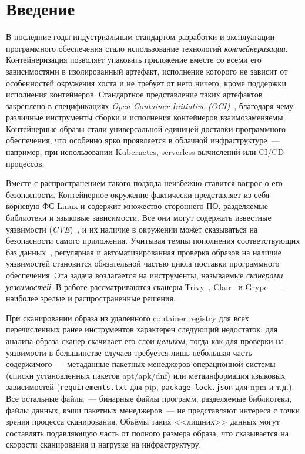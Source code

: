 \section{Введение}
\label{sec:Chapter0} 

В последние годы индустриальным стандартом разработки и эксплуатации программного обеспечения стало использование технологий \textit{контейнеризации}. Контейнеризация позволяет упаковать приложение вместе со всеми его зависимостями в изолированный артефакт, исполнение которого не зависит от особенностей окружения хоста и не требует от него ничего, кроме поддержки исполнения контейнеров. Стандартное представление таких артефактов закреплено в спецификациях \textit{Open Container Initiative (OCI)}~\cite{oci}, благодаря чему различные инструменты сборки и исполнения контейнеров взаимозаменяемы. Контейнерные образы стали универсальной единицей доставки программного обеспечения, что особенно ярко проявляется в облачной инфраструктуре~--- например, при использовании Kubernetes, serverless-вычислений или CI/CD-процессов.

Вместе с распространением такого подхода неизбежно ставится вопрос о его безопасности. Контейнерное окружение фактически представляет из себя корневую ФС Linux и содержит множество стороннего ПО, разделяемые библиотеки и языковые зависимости. Все они могут содержать известные уязвимости (\textit{CVE})~\cite{cve}, и их наличие в окружении может сказываться на безопасности самого приложения. Учитывая темпы пополнения соответствующих баз данных~\cite{nvd}, регулярная и автоматизированная проверка образов на наличие уязвимостей становится обязательной частью цикла поставки программного обеспечения. Эта задача возлагается на инструменты, называемые \textit{сканерами уязвимостей}. В работе рассматриваются сканеры Trivy~\cite{trivy}, Clair~\cite{clair} и Grype~\cite{grype}~--- наиболее зрелые и распространенные решения.

При сканировании образа из удаленного container registry для всех перечисленных ранее инструментов характерен следующий недостаток: для анализа образа сканер скачивает его слои \textit{целиком}, тогда как для проверки на уязвимости в большинстве случаев требуется лишь небольшая часть содержимого~--- метаданные пакетных менеджеров операционной системы (списки установленных пакетов apt/apk/dnf) или метаинформация языковых зависимостей (\texttt{requirements.txt} для pip, \texttt{package-lock.json} для npm и т.д.). Все остальные файлы~--- бинарные файлы программ, разделяемые библиотеки, файлы данных, кэши пакетных менеджеров~--- не представляют интереса с точки зрения процесса сканирования. Объёмы таких <<лишних>> данных могут составлять подавляющую часть от полного размера образа, что сказывается на скорости сканирования и нагрузке на инфраструктуру.

